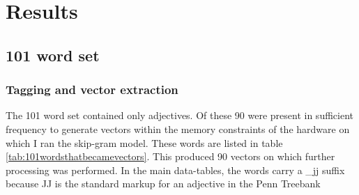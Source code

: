 \chapter{Results}

\section{101 word set}

\subsection{Tagging and vector extraction}

The 101 word set contained only adjectives. Of these 90 were present in 
sufficient frequency to generate vectors within the memory constraints of the 
hardware on which I ran the skip-gram model. These words are listed in table 
\ref{tab:101wordsthatbecamevectors}. This produced 90 vectors on which further 
processing was performed. In the main data-tables, the words carry a \_jj suffix
because JJ is the standard markup for an adjective in the Penn Treebank
\citep{Marcus1993}


